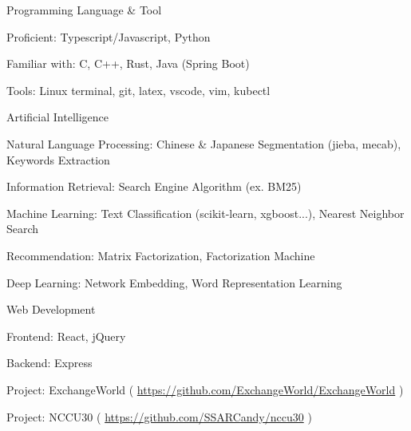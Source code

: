 

\begin{cventries}

	\cventry
	{}
	{Programming Language \& Tool}
	{}
	{}
	{
		\begin{cvitems}
			\item {Proficient: Typescript/Javascript, Python}
			\item {Familiar with: C, C++, Rust, Java (Spring Boot)}
			\item {Tools: Linux terminal, git, latex, vscode, vim, kubectl}
		\end{cvitems}
	}

	\cventry
	{} %
	{Artificial Intelligence} %
	{} %
	{} %
	{
		\begin{cvitems} %
			\item {Natural Language Processing: Chinese \& Japanese Segmentation (jieba, mecab), Keywords Extraction}
			\item {Information Retrieval: Search Engine Algorithm (ex. BM25)}
			\item {Machine Learning: Text Classification (scikit-learn, xgboost...), Nearest Neighbor Search}
			\item {Recommendation: Matrix Factorization, Factorization Machine}
			\item {Deep Learning: Network Embedding, Word Representation Learning}
		\end{cvitems}
	}

	\cventry
	{} %
	{Web Development} %
	{} %
	{} %
	{
		\begin{cvitems} %
			\item {Frontend: React, jQuery}
			\item {Backend: Express}
			\item {Project: ExchangeWorld ( \url{https://github.com/ExchangeWorld/ExchangeWorld} )}
			\item {Project: NCCU30 ( \url{https://github.com/SSARCandy/nccu30} )}
		\end{cvitems}
	}


\end{cventries}
